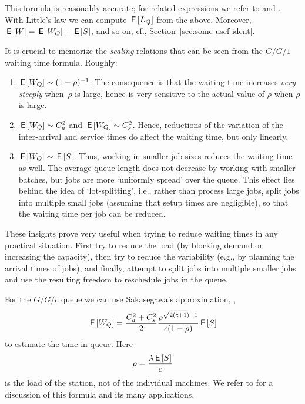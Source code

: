 This formula is reasonably accurate; for related expressions we refer
to \citet{bolch06:_queuein_networ_markov_chain} and
\citet{hall91:_queuein_method_servic_manuf}. With Little's law we can
compute $\,\mathsf{E}\left[L_Q\right]$ from the above. Moreover, $\,\mathsf{E}\left[W\right] = \,\mathsf{E}\left[W_Q\right] + \,\mathsf{E}\left[S\right]$,
and so on, cf., Section~\ref{sec:some-usef-ident}.



It is crucial to memorize the \emph{scaling} relations that can be
seen from the $G/G/1$ waiting time formula. Roughly:
\begin{enumerate}
\item $\,\mathsf{E}\left[W_Q\right] \sim (1-\rho)^{-1}$. The consequence is that the waiting
  time increases \emph{very steeply} when~$\rho$ is large, hence is
  very sensitive to the actual value of $\rho$ when $\rho$ is large.
\item $\,\mathsf{E}\left[W_Q\right] \sim C_a^2$ and $\,\mathsf{E}\left[W_Q\right] \sim C_s^2$. Hence, reductions
  of the variation of the inter-arrival and service times do affect the
  waiting time, but only linearly.
\item $\,\mathsf{E}\left[W_Q\right] \sim \,\mathsf{E}\left[S\right]$. Thus, working in smaller job sizes reduces
  the waiting time as well. The average queue length does not decrease by
  working with smaller batches, but jobs are more `uniformly spread'
  over the queue. This effect lies behind the idea of
  `lot-splitting', i.e., rather than process large jobs, split jobs
  into multiple small jobs (assuming that setup times are negligible),
  so that the waiting time per job can be reduced.
\end{enumerate}

These insights prove very useful when trying to reduce waiting times
in any practical situation. First try to reduce the load (by blocking
demand or increasing the capacity), then try to reduce the variability
(e.g., by planning the arrival times of jobs), and finally, attempt to
split jobs into multiple smaller jobs and use the resulting freedom to
reschedule jobs in the queue.

For the $G/G/c$ queue we can use Sakasegawa's approximation, \cite{sakasegawa77:_l}, 
\begin{equation}\label{eq:7}
  \,\mathsf{E}\left[W_Q\right] = \frac{C_a^2+C_s^2}2 \frac{\rho^{\sqrt{2(c+1)}-1}}{c(1-\rho)} \,\mathsf{E}\left[S\right]
\end{equation}
to estimate the time in queue.  Here
\begin{equation*}
  \rho = \frac{\lambda \,\mathsf{E}\left[S\right]}{c}
\end{equation*}
is the load of the station, not of the individual machines. We refer to \cite{hopp08:_factor_physic} for a discussion of this formula and its many applications.


